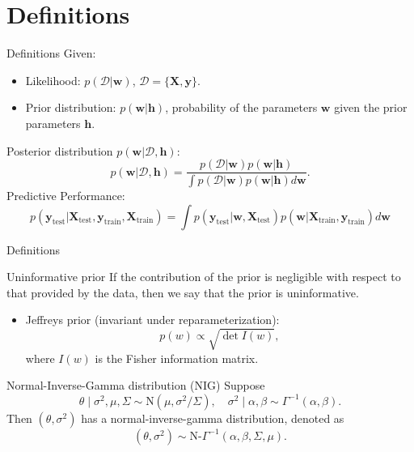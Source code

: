 \documentclass{beamer}
\begin{document}
\section{Definitions}
\begin{frame}{Definitions}
    Given:
    \begin{itemize}
        \item Likelihood: $p(\mathcal{D}|\mathbf{w})$, $\mathcal{D} = \{\mathbf{X}, \mathbf{y}\}$.
        \item Prior distribution: $p(\mathbf{w}|\mathbf{h})$, probability of the parameters $\mathbf{w}$ given the prior parameters $\mathbf{h}$.
    \end{itemize}
    Posterior distribution $p(\mathbf{w}|\mathcal{D}, \mathbf{h})$:
    $$p(\mathbf{w}|\mathcal{D}, \mathbf{h}) = \frac{p(\mathcal{D}|\mathbf{w})p(\mathbf{w}|\mathbf{h})}{\int p(\mathcal{D}|\mathbf{w})p(\mathbf{w}|\mathbf{h}) d\mathbf{w}}.$$
    Predictive Performance:
    $$p(\mathbf{y}_{\text{test}}|\mathbf{X}_{\text{test}}, \mathbf{y}_{\text{train}}, \mathbf{X}_{\text{train}}) = \int p(\mathbf{y}_{\text{test}}|\mathbf{w}, \mathbf{X}_{\text{test}}) p(\mathbf{w}|\mathbf{X}_{\text{train}}, \mathbf{y}_{\text{train}})d\mathbf{w}$$

\end{frame}
\begin{frame}{Definitions}
    \begin{block}{Uninformative prior}
        If the contribution of the prior is negligible with respect to that provided by the data, then we say that the prior is uninformative. 
        \begin{itemize}
            \item  Jeffreys prior (invariant under reparameterization):
        \[
        p(w) \propto \sqrt{\det I(w)},
        \]
        where \( I(w) \) is the Fisher information matrix. 
        \end{itemize}
    \end{block}
    \begin{block}{Normal-Inverse-Gamma distribution (NIG)}
    Suppose
    \[
    \theta \mid \sigma^2, \mu, \Sigma \sim \mathrm{N}(\mu, \sigma^2 / \Sigma), \quad \sigma^2 \mid \alpha, \beta \sim \Gamma^{-1}(\alpha, \beta).
    \]
    Then \((\theta, \sigma^2)\) has a normal-inverse-gamma distribution, denoted as
    \[
    (\theta, \sigma^2) \sim \text{N-}\Gamma^{-1}(\alpha,\beta,\Sigma,\mu).
    \]
    \end{block}
\end{frame}
\end{document}
